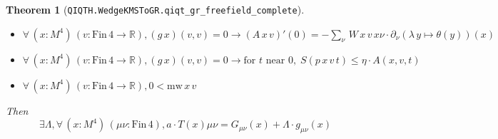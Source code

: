 \documentclass[11pt]{article}
\newtheorem{theorem}{Theorem}[section]
\begin{document}
\begin{theorem}[\texttt{QIQTH.WedgeKMSToGR.qiqt\_gr\_freefield\_complete}]
\begin{itemize}
  \item[\rm(hA)] $\forall\,(x : M^{{4}})\,(v : \mathrm{Fin}\,4 \to \mathbb{R}), ({g\,x})({v},{v}) = 0 \to ({A\,x\,v})'({0})={-\sum_{\nu}\,W\,x\,v\,x \nu \cdot \partial_{{\nu}}({\lambda\,y \mapsto \theta({y})})({x})}$
  \item[\rm(hbound)] $\forall\,(x : M^{{4}})\,(v : \mathrm{Fin}\,4 \to \mathbb{R}), ({g\,x})({v},{v}) = 0 \to \text{for }t\text{ near }0,\; S({p\,x\,v\,t}) \le \eta \cdot A({x},{v},{t})$
  \item[\rm(hmw)] $\forall\,(x : M^{{4}})\,(v : \mathrm{Fin}\,4 \to \mathbb{R}), 0 < \mathrm{mw}\,x\,v$
\end{itemize}
Then \[ \exists \Lambda, \forall\,(x : M^{{4}})\,(\mu \nu : \mathrm{Fin}\,4), a \cdot T({x}) \mu \nu = G_{{\mu}{\nu}}({x}) + \Lambda \cdot g_{{\mu}{\nu}}({x}) \]
\end{theorem}
\end{document}
